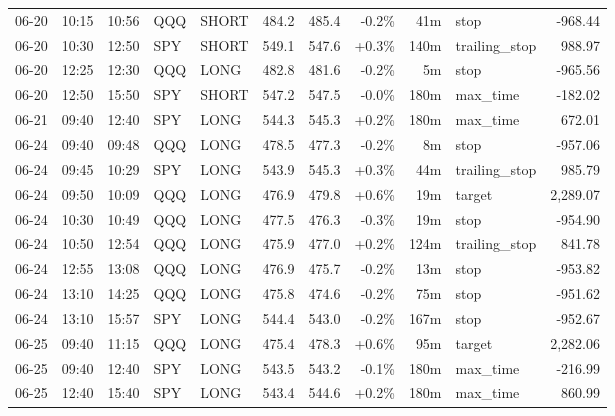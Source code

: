 \documentclass[11pt,a4paper,twoside]{article}
\begin{document}
\begin{center}
\begin{longtable}{>{\color{txtmain}}l l l l l r r r r >{\color{txtmain}}l r}
06-20 & 10:15 & 10:56 & QQQ & SHORT & 484.2 & 485.4 & \textcolor{lossred}{-0.2\%} & 41m & stop & \textcolor{lossred}{-968.44} \\
06-20 & 10:30 & 12:50 & SPY & SHORT & 549.1 & 547.6 & \textcolor{wingreen}{+0.3\%} & 140m & trailing\_stop & \textcolor{wingreen}{988.97} \\
06-20 & 12:25 & 12:30 & QQQ & LONG & 482.8 & 481.6 & \textcolor{lossred}{-0.2\%} & 5m & stop & \textcolor{lossred}{-965.56} \\
06-20 & 12:50 & 15:50 & SPY & SHORT & 547.2 & 547.5 & \textcolor{lossred}{-0.0\%} & 180m & max\_time & \textcolor{lossred}{-182.02} \\
06-21 & 09:40 & 12:40 & SPY & LONG & 544.3 & 545.3 & \textcolor{wingreen}{+0.2\%} & 180m & max\_time & \textcolor{wingreen}{672.01} \\
06-24 & 09:40 & 09:48 & QQQ & LONG & 478.5 & 477.3 & \textcolor{lossred}{-0.2\%} & 8m & stop & \textcolor{lossred}{-957.06} \\
06-24 & 09:45 & 10:29 & SPY & LONG & 543.9 & 545.3 & \textcolor{wingreen}{+0.3\%} & 44m & trailing\_stop & \textcolor{wingreen}{985.79} \\
06-24 & 09:50 & 10:09 & QQQ & LONG & 476.9 & 479.8 & \textcolor{wingreen}{+0.6\%} & 19m & target & \textcolor{wingreen}{2,289.07} \\
06-24 & 10:30 & 10:49 & QQQ & LONG & 477.5 & 476.3 & \textcolor{lossred}{-0.3\%} & 19m & stop & \textcolor{lossred}{-954.90} \\
06-24 & 10:50 & 12:54 & QQQ & LONG & 475.9 & 477.0 & \textcolor{wingreen}{+0.2\%} & 124m & trailing\_stop & \textcolor{wingreen}{841.78} \\
06-24 & 12:55 & 13:08 & QQQ & LONG & 476.9 & 475.7 & \textcolor{lossred}{-0.2\%} & 13m & stop & \textcolor{lossred}{-953.82} \\
06-24 & 13:10 & 14:25 & QQQ & LONG & 475.8 & 474.6 & \textcolor{lossred}{-0.2\%} & 75m & stop & \textcolor{lossred}{-951.62} \\
06-24 & 13:10 & 15:57 & SPY & LONG & 544.4 & 543.0 & \textcolor{lossred}{-0.2\%} & 167m & stop & \textcolor{lossred}{-952.67} \\
06-25 & 09:40 & 11:15 & QQQ & LONG & 475.4 & 478.3 & \textcolor{wingreen}{+0.6\%} & 95m & target & \textcolor{wingreen}{2,282.06} \\
06-25 & 09:40 & 12:40 & SPY & LONG & 543.5 & 543.2 & \textcolor{lossred}{-0.1\%} & 180m & max\_time & \textcolor{lossred}{-216.99} \\
06-25 & 12:40 & 15:40 & SPY & LONG & 543.4 & 544.6 & \textcolor{wingreen}{+0.2\%} & 180m & max\_time & \textcolor{wingreen}{860.99} \\

\end{longtable}
\end{center}
\end{document}
